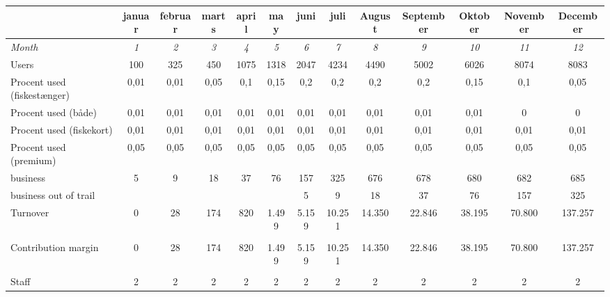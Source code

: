 \begin{tabular}{|p{5cm}|c|c|c|c|c|c|c|c|c|c|c|c|}
\hline
\rowcolor[HTML]{C0C0C0} 
 & januar & februar & marts & april & may & juni & juli & August & September & Oktober & November & \multicolumn{1}{c|}{\cellcolor[HTML]{C0C0C0}December} \\ \hline
\textit{Month} & \textit{1} & \textit{2} & \textit{3} & \textit{4} & \textit{5} & \textit{6} & \textit{7} & \textit{8} & \textit{9} & \textit{10} & \textit{11} & \multicolumn{1}{c|}{\textit{12}} \\ \hline\hline
\rowcolor[HTML]{C0C0C0} 
Users & 100 & 325 & 450 & 1075 & 1318 & 2047 & 4234 & 4490 & 5002 & 6026 & 8074 & \multicolumn{1}{c|}{\cellcolor[HTML]{C0C0C0}8083} \\ \hline
Procent used (fiskestænger) & 0,01 & 0,01 & 0,05 & 0,1 & 0,15 & 0,2 & 0,2 & 0,2 & 0,2 & 0,15 & 0,1 & \multicolumn{1}{c|}{0,05} \\ \hline
\rowcolor[HTML]{C0C0C0} 
Procent used (både) & 0,01 & 0,01 & 0,01 & 0,01 & 0,01 & 0,01 & 0,01 & 0,01 & 0,01 & 0,01 & 0 & \multicolumn{1}{c|}{\cellcolor[HTML]{C0C0C0}0} \\ \hline
Procent used (fiskekort) & 0,01 & 0,01 & 0,01 & 0,01 & 0,01 & 0,01 & 0,01 & 0,01 & 0,01 & 0,01 & 0,01 & \multicolumn{1}{c|}{0,01} \\ \hline
\rowcolor[HTML]{C0C0C0} 
Procent used (premium) & 0,05 & 0,05 & 0,05 & 0,05 & 0,05 & 0,05 & 0,05 & 0,05 & 0,05 & 0,05 & 0,05 & \multicolumn{1}{c|}{\cellcolor[HTML]{C0C0C0}0,05} \\ \hline
business & 5 & 9 & 18 & 37 & 76 & 157 & 325 & 676 & 678 & 680 & 682 & \multicolumn{1}{c|}{685} \\ \hline
\rowcolor[HTML]{C0C0C0} 
business out of trail &  &  &  &  &  & 5 & 9 & 18 & 37 & 76 & 157 & \multicolumn{1}{c|}{\cellcolor[HTML]{C0C0C0}325} \\ \hline
Turnover & 0 & 28 & 174 & 820 & 1.499 & 5.159 & 10.251 & 14.350 & 22.846 & 38.195 & 70.800 & \multicolumn{1}{c|}{137.257} \\ \hline\hline
\rowcolor[HTML]{C0C0C0} 
\multicolumn{13}{|l|}{\cellcolor[HTML]{C0C0C0}Variable costs} \\ \hline
Contribution margin & 0 & 28 & 174 & 820 & 1.499 & 5.159 & 10.251 & 14.350 & 22.846 & 38.195 & 70.800 & \multicolumn{1}{c|}{137.257} \\ \hline\hline
\rowcolor[HTML]{C0C0C0} 
\multicolumn{13}{|l|}{\cellcolor[HTML]{C0C0C0}Fixed cost} \\ \hline
Staff & 2 & 2 & 2 & 2 & 2 & 2 & 2 & 2 & 2 & 2 & 2 & \multicolumn{1}{c|}{2} \\ \hline

\end{tabular}
